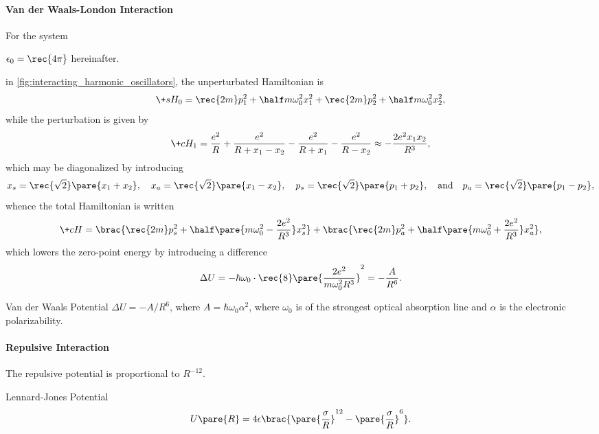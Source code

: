 \documentclass[hidelinks]{article}
\begin{document}
\paragraph{Van der Waals-London Interaction} %
\label{par:van_der_waals_london_interaction}

For the system \begin{marginwarns}
    $\displaystyle \epsilon_0 = \rec{4\pi}$ hereinafter.
\end{marginwarns} in \cref{fig:interacting_harmonic_oscillators}, the unperturbated Hamiltonian is
\[ \+sH_0 = \rec{2m}p_1^2 + \half m\omega_0^2 x_1^2 + \rec{2m}p_2^2 + \half m\omega_0^2 x_2^2, \]
while the perturbation is given by
\[ \+cH_1 = \frac{e^2}{R} + \frac{e^2}{R+x_1 - x_2} - \frac{e^2}{R+x_1} - \frac{e^2}{R - x_2} \approx -\frac{2e^2 x_1x_2}{R^3}, \]
which may be diagonalized by introducing
\[ x_s = \rec{\sqrt{2}}\pare{x_1+x_2},\quad x_a = \rec{\sqrt{2}}\pare{x_1 - x_2},\quad p_s = \rec{\sqrt{2}}\pare{p_1+p_2},\quad \text{and}\quad p_a = \rec{\sqrt{2}}\pare{p_1 - p_2}, \]
whence the total Hamiltonian is written
\[ \+cH = \brac{\rec{2m}p_s^2 + \half\pare{m\omega_0^2 - \frac{2e^2}{R^3}}x_s^2} + \brac{\rec{2m}p_a^2 + \half \pare{m\omega_0^2+\frac{2e^2}{R^3}}x_a^2}, \]
which lowers the zero-point energy by introducing a difference
\[ \Delta U = -\hbar\omega_0 \cdot \rec{8}\pare{\frac{2e^2}{m\omega_0^2 R^3}}^2 = -\frac{A}{R^6}. \]
\vspace{-\baselineskip}
\begin{finaleq}{Van der Waals Potential}
    $\displaystyle \Delta U = -{A}/{R^6}$, where $A = \hbar\omega_0 \alpha^2$, where $\omega_0$ is of the strongest optical absorption line and $\alpha$ is the electronic polarizability.
\end{finaleq}


\paragraph{Repulsive Interaction} %
\label{par:repulsive_interaction}

The repulsive potential is proportional to $R^{-12}$.
\begin{finaleq}{Lennard-Jones Potential}
    \[ U\pare{R} = 4\epsilon\brac{\pare{\frac{\sigma}{R}}^{12} - \pare{\frac{\sigma}{R}}^6}. \]
\end{finaleq}

\end{document}
